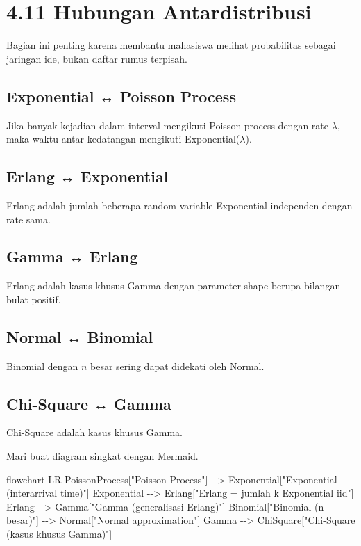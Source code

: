 \documentclass[
  letterpaper,
  DIV=11,
  numbers=noendperiod]{scrreprt}
\newenvironment{Shaded}{\begin{snugshade}}{\end{snugshade}}
\newcommand{\NormalTok}[1]{\textcolor[rgb]{0.00,0.23,0.31}{#1}}
\begin{document}
\section{4.11 Hubungan Antardistribusi}\label{hubungan-antardistribusi}

Bagian ini penting karena membantu mahasiswa melihat probabilitas
sebagai jaringan ide, bukan daftar rumus terpisah.

\subsection{Exponential ↔ Poisson
Process}\label{exponential-poisson-process}

Jika banyak kejadian dalam interval mengikuti Poisson process dengan
rate \(\lambda\), maka waktu antar kedatangan mengikuti
Exponential(\(\lambda\)).

\subsection{Erlang ↔ Exponential}\label{erlang-exponential}

Erlang adalah jumlah beberapa random variable Exponential independen
dengan rate sama.

\subsection{Gamma ↔ Erlang}\label{gamma-erlang}

Erlang adalah kasus khusus Gamma dengan parameter shape berupa bilangan
bulat positif.

\subsection{Normal ↔ Binomial}\label{normal-binomial}

Binomial dengan \(n\) besar sering dapat didekati oleh Normal.

\subsection{Chi-Square ↔ Gamma}\label{chi-square-gamma}

Chi-Square adalah kasus khusus Gamma.

Mari buat diagram singkat dengan Mermaid.

\begin{Shaded}
\begin{Highlighting}[]
\NormalTok{flowchart LR}
\NormalTok{    PoissonProcess["Poisson Process"] {-}{-}\textgreater{} Exponential["Exponential (interarrival time)"]}
\NormalTok{    Exponential {-}{-}\textgreater{} Erlang["Erlang = jumlah k Exponential iid"]}
\NormalTok{    Erlang {-}{-}\textgreater{} Gamma["Gamma (generalisasi Erlang)"]}
\NormalTok{    Binomial["Binomial (n besar)"] {-}{-}\textgreater{} Normal["Normal approximation"]}
\NormalTok{    Gamma {-}{-}\textgreater{} ChiSquare["Chi{-}Square (kasus khusus Gamma)"]}
\end{Highlighting}
\end{Shaded}
\end{document}
